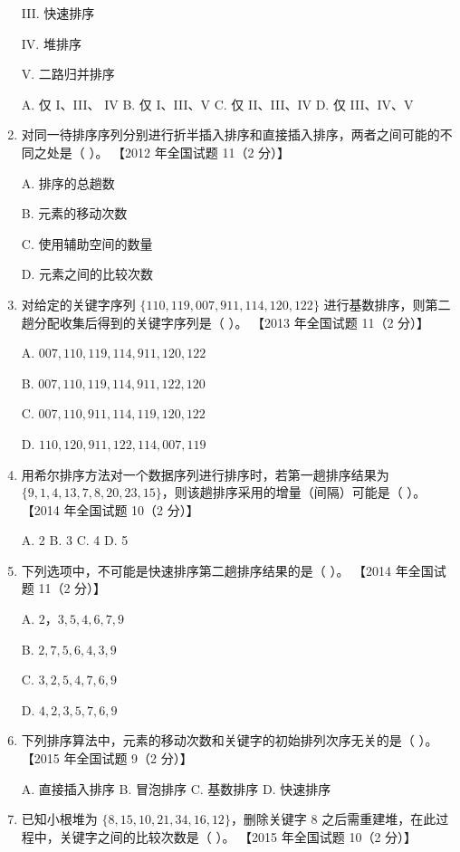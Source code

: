 \documentclass[lang=cn,newtx,10pt,scheme=chinese]{../../elegantbook}
\begin{document}
\begin{enumerate}
    III. 快速排序  

    IV. 堆排序  

    V. 二路归并排序  

    A. 仅 I、III、 IV \quad B. 仅 I、III、V \quad C. 仅 II、III、IV \quad D. 仅 III、IV、V  

    \item 对同一待排序序列分别进行折半插入排序和直接插入排序，两者之间可能的不同之处是（ ）。  
    【2012 年全国试题 11（2 分）】  

    A. 排序的总趟数  

    B. 元素的移动次数  

    C. 使用辅助空间的数量  

    D. 元素之间的比较次数

    \item 对给定的关键字序列 $\{110, 119, 007, 911, 114, 120, 122\}$ 进行基数排序，则第二趟分配收集后得到的关键字序列是（ ）。  
    【2013 年全国试题 11（2 分）】  

    A. $007, 110, 119, 114, 911, 120, 122$  

    B. $007, 110, 119, 114, 911, 122, 120$  

    C. $007, 110, 911, 114, 119, 120, 122$  

    D. $110, 120, 911, 122, 114, 007, 119$  

    \item 用希尔排序方法对一个数据序列进行排序时，若第一趟排序结果为 $\{9, 1, 4, 13, 7, 8, 20, 23, 15\}$，则该趟排序采用的增量（间隔）可能是（ ）。  
    【2014 年全国试题 10（2 分）】  

    A. 2 \quad B. 3 \quad C. 4 \quad D. 5  

    \item 下列选项中，不可能是快速排序第二趟排序结果的是（ ）。  
    【2014 年全国试题 11（2 分）】  

    A. $2，3, 5, 4,  6,7, 9$  

    B. $2,7,5,6,4,3,9$  

    C. $3, 2, 5,4, 7, 6, 9$  

    D. $4, 2, 3, 5, 7, 6, 9$  

    \item 下列排序算法中，元素的移动次数和关键字的初始排列次序无关的是（ ）。  
    【2015 年全国试题 9（2 分）】  

    A. 直接插入排序 \quad B. 冒泡排序 \quad C. 基数排序 \quad D. 快速排序  

    \item 已知小根堆为 $\{8, 15, 10, 21, 34, 16, 12\}$，删除关键字 8 之后需重建堆，在此过程中，关键字之间的比较次数是（ ）。  
    【2015 年全国试题 10（2 分）】  


\end{enumerate}
\end{document}
